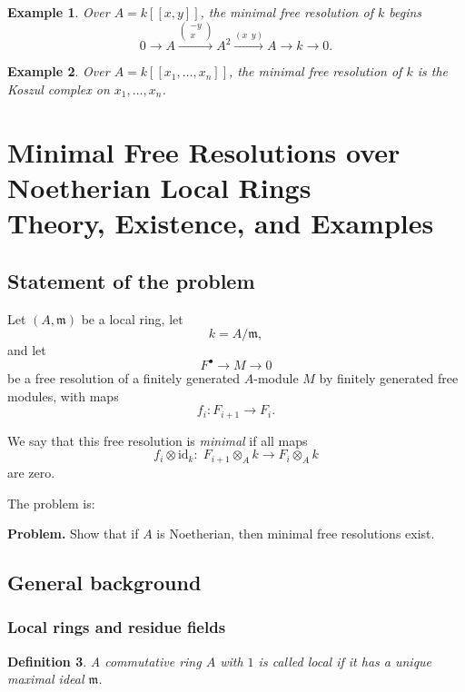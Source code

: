 \documentclass[12pt,a4paper]{article}
\theoremstyle{notespace}
\newtheorem{definition}{Definition}[section]
\newtheorem{example}[definition]{Example}
\newcommand{\m}{\mathfrak m}
\begin{document}
\begin{example}
	Over \(A=k[[x,y]]\), the minimal free resolution of \(k\) begins
	\[
	0\to A \xrightarrow{\begin{pmatrix}-y\\x\end{pmatrix}} A^2 \xrightarrow{(x\ \ y)} A \to k\to 0.
	\]
\end{example}

\begin{example}
	Over \(A=k[[x_1,\dots,x_n]]\), the minimal free resolution of \(k\) is the Koszul complex on \(x_1,\dots,x_n\).
\end{example}
\section{\textbf{Minimal Free Resolutions over Noetherian Local Rings\\
		Theory, Existence, and Examples}}

\subsection{Statement of the problem}

Let \((A,\m)\) be a local ring, let
\[
k=A/\m,
\]
and let
\[
F^\bullet \to M \to 0
\]
be a free resolution of a finitely generated \(A\)-module \(M\) by finitely generated free modules, with maps
\[
f_i:F_{i+1}\to F_i.
\]

We say that this free resolution is \emph{minimal} if all maps
\[
f_i\otimes \mathrm{id}_k:\; F_{i+1}\otimes_A k \longrightarrow F_i\otimes_A k
\]
are zero.

The problem is:

\medskip

\textbf{Problem.}
Show that if \(A\) is Noetherian, then minimal free resolutions exist.

\subsection{General background}

\subsubsection{Local rings and residue fields}

\begin{definition}
	A commutative ring \(A\) with \(1\) is called \emph{local} if it has a unique maximal ideal \(\m\).
\end{definition}
\end{document}
